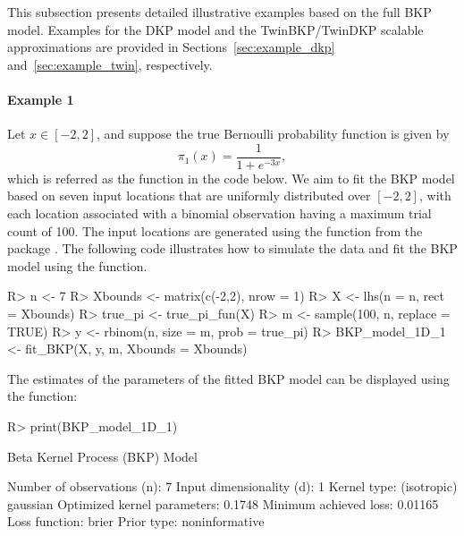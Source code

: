\documentclass[article, shortnames]{jss}
\newcommand{\fct}[1]{\code{#1()}}
\begin{document}
This subsection presents detailed illustrative examples based on the full BKP model. 
Examples for the DKP model and the TwinBKP/TwinDKP scalable approximations are provided in Sections~\ref{sec:example_dkp} and~\ref{sec:example_twin}, respectively.

\paragraph{Example 1} Let $x\in[-2,2]$, and suppose the true Bernoulli probability function is given by
\begin{equation}\label{eq:bkp-1d-generate-function-1}
	\pi_{1}(x) = \frac{1}{1+e^{-3x}},
\end{equation}
which is referred as the function  in the code below.
We aim to fit the BKP model based on seven input locations that are uniformly distributed over $[-2,2]$, with each location associated with a binomial observation having a maximum trial count of 100. The input locations are generated using the \fct{lhs} function from the  package  \citep{Gramacy2010tgp2}. The following  code illustrates how to simulate the data and fit the BKP model using the \fct{fit\_BKP} function.

\begin{CodeChunk}
\begin{CodeInput}    
R> n <- 7
R> Xbounds <- matrix(c(-2,2), nrow = 1) 
R> X <- lhs(n = n, rect = Xbounds) 
R> true_pi <- true_pi_fun(X) 
R> m <- sample(100, n, replace = TRUE)
R> y <- rbinom(n, size = m, prob = true_pi) 
R> BKP_model_1D_1 <- fit_BKP(X, y, m, Xbounds = Xbounds)
\end{CodeInput}
\end{CodeChunk}

The estimates of the parameters of the fitted BKP model can be displayed using the \fct{print} function:

\begin{CodeChunk}
\begin{CodeInput} 
R> print(BKP_model_1D_1)
\end{CodeInput}
\begin{CodeOutput}  
       Beta Kernel Process (BKP) Model    

Number of observations (n):  7
Input dimensionality (d):    1
Kernel type:                 (isotropic) gaussian
Optimized kernel parameters: 0.1748
Minimum achieved loss:       0.01165
Loss function:               brier
Prior type:                  noninformative
\end{CodeOutput}
\end{CodeChunk}
\end{document}
